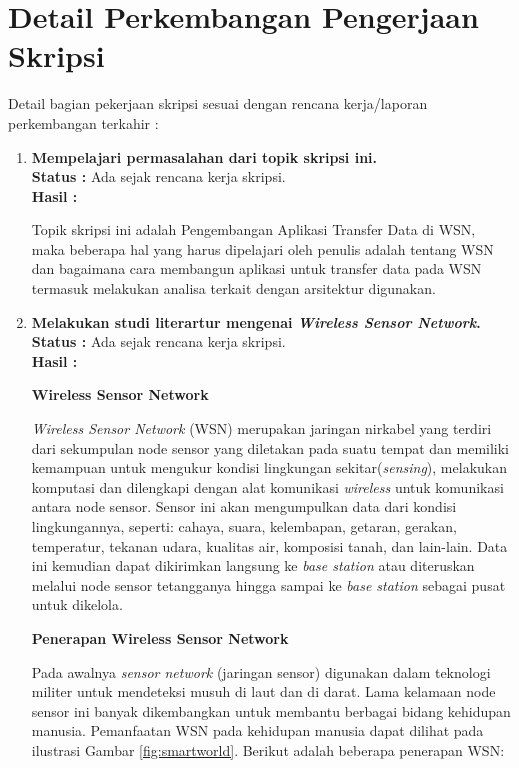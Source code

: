 \documentclass[a4paper,twoside]{article}
\begin{document}
\section{Detail Perkembangan Pengerjaan Skripsi}
Detail bagian pekerjaan skripsi sesuai dengan rencana kerja/laporan perkembangan terkahir :
	\begin{enumerate}
		\item \textbf{Mempelajari permasalahan dari topik skripsi ini.}\\
		{\bf Status :} Ada sejak rencana kerja skripsi.\\
		{\bf Hasil :} 
		
		Topik skripsi ini adalah Pengembangan Aplikasi Transfer Data di WSN, maka beberapa hal yang harus dipelajari oleh penulis adalah tentang WSN dan bagaimana cara membangun aplikasi untuk transfer data pada WSN termasuk melakukan analisa terkait dengan arsitektur digunakan.
		
		\item \textbf{Melakukan studi literartur mengenai \textit{Wireless Sensor Network}.}\\
		{\bf Status :} Ada sejak rencana kerja skripsi.\\
		{\bf Hasil :} 

\textbf{Wireless Sensor Network}
		
\textit{Wireless Sensor Network} (WSN) merupakan jaringan nirkabel yang terdiri dari sekumpulan node sensor yang diletakan pada suatu tempat dan memiliki kemampuan untuk mengukur kondisi lingkungan sekitar(\textit{sensing}), melakukan komputasi dan dilengkapi dengan alat komunikasi \textit{wireless} untuk komunikasi antara node sensor. Sensor ini akan mengumpulkan data dari kondisi lingkungannya, seperti: cahaya, suara, kelembapan, getaran, gerakan, temperatur, tekanan udara, kualitas air, komposisi tanah, dan lain-lain. Data ini kemudian dapat dikirimkan langsung ke \textit{base station} atau diteruskan melalui node sensor tetangganya hingga sampai ke \textit{base station} sebagai pusat untuk dikelola.

\textbf{Penerapan Wireless Sensor Network}

Pada awalnya \textit{sensor network} (jaringan sensor) digunakan dalam teknologi militer untuk mendeteksi musuh di laut dan di darat. Lama kelamaan node sensor ini banyak dikembangkan untuk membantu berbagai bidang kehidupan manusia. Pemanfaatan WSN pada kehidupan manusia dapat dilihat pada ilustrasi Gambar \ref{fig:smartworld}. Berikut adalah beberapa penerapan WSN:


\end{enumerate}
\end{document}
